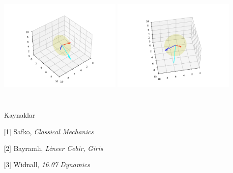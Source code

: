 \documentclass[12pt,fleqn]{article}\usepackage{../../common}
\begin{document}
\includegraphics[height=6cm,width=6cm]{vision_02_03.png}
\includegraphics[height=6cm,width=6cm]{vision_02_04.png}


Kaynaklar

[1] Safko, {\em Classical Mechanics}

[2] Bayramlı, {\em Lineer Cebir, Giris}

[3] Widnall, {\em 16.07 Dynamics}
\end{document}
